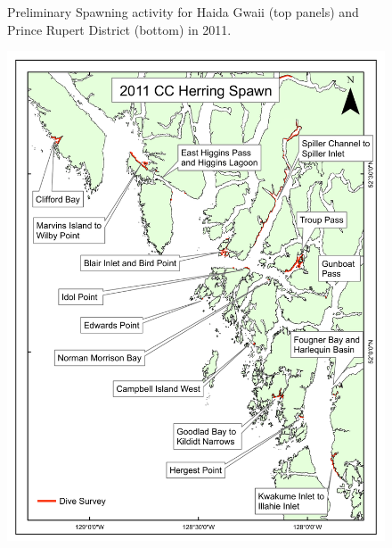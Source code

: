 \begin{figure}[!tbp]
	\caption{Preliminary Spawning activity for Haida Gwaii (top panels) and Prince Rupert District (bottom) in 2011.}
\end{figure}
\begin{figure}[!tbp]
	\ContinuedFloat
	\centering
	\includegraphics[scale=0.35]{../Figs/PBSfigs/2011_spawn_CCJuly13.pdf}

\end{figure}

